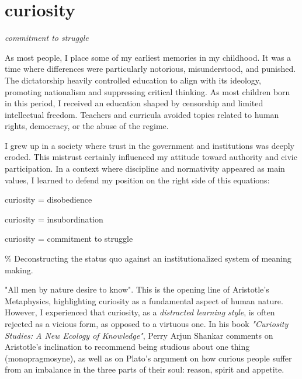 \chapter*{curiosity}
\begin{center}
\vspace{2cm}
\begin{flushright}
\large
\textit{commitment to struggle}
\end{flushright}
\vspace*{\fill}
\end{center}
\normalsize

\newpage 
As most people, I place some of my earliest memories in my childhood. It was a time where differences were particularly notorious, misunderstood, and punished. The dictatorship heavily controlled education to align with its ideology, promoting nationalism and suppressing critical thinking. As most children born in this period, I received an education shaped by censorship and limited intellectual freedom. Teachers and curricula avoided topics related to human rights, democracy, or the abuse of the regime. 

I grew up in a society where trust in the government and institutions was deeply eroded. This mistrust certainly influenced my attitude toward authority and civic participation. In a context where discipline and normativity appeared as main values, I learned to defend my position on the right side of this equations: 

curiosity = disobedience

curiosity = insubordination

curiosity = commitment to struggle 

{\scriptsize \textcolor{comment}{\%  Deconstructing the status quo against an institutionalized system of meaning making.}}

"All men by nature desire to know". This is the opening line of Aristotle's Metaphysics, highlighting curiosity as a fundamental aspect of human nature.  However, I experienced that curiosity, as a \textit{distracted learning style}, is often rejected as a vicious form, as opposed to a virtuous one. In his book \textit{"Curiosity Studies: A New Ecology of Knowledge"}, Perry Arjun Shankar comments on Aristotle's inclination to recommend being studious about one thing (monopragmosyne), as well as on Plato's argument on how curious people suffer from an imbalance in the three parts of their soul: reason, spirit and appetite. \citep{perry2020}


